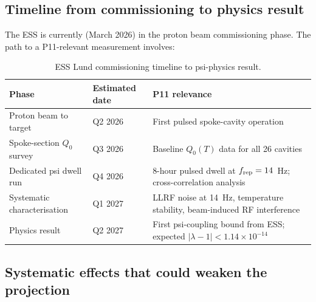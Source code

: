\documentclass[11pt,twocolumn]{article}
\newcommand{\lam}{\lambda}
\newcommand{\ee}[1]{\times 10^{#1}}
\begin{document}
\subsection{Timeline from commissioning to physics result}
\label{sec:ess_commissioning_timeline}

The ESS is currently (March 2026) in the proton beam commissioning phase.
The path to a P11-relevant measurement involves:

\begin{table}[h!]
\caption{ESS Lund commissioning timeline to psi-physics result.}
\label{tab:ess_timeline}
\begin{tabular}{llp{5cm}}
\toprule
Phase & Estimated date & P11 relevance \\
\midrule
Proton beam to target & Q2 2026 & First pulsed spoke-cavity operation \\
Spoke-section $Q_0$ survey & Q3 2026 & Baseline $Q_0(T)$ data for all 26 cavities \\
Dedicated psi dwell run & Q4 2026 & 8-hour pulsed dwell at $f_{\rm rep} = 14$~Hz;
                                      cross-correlation analysis \\
Systematic characterisation & Q1 2027 & LLRF noise at 14~Hz, temperature stability,
                                          beam-induced RF interference \\
Physics result & Q2 2027 & First psi-coupling bound from ESS; expected $|\lam-1| < 1.14\ee{-14}$ \\
\bottomrule
\end{tabular}
\end{table}

\subsection{Systematic effects that could weaken the projection}
\label{sec:ess_systematics}
\end{document}

